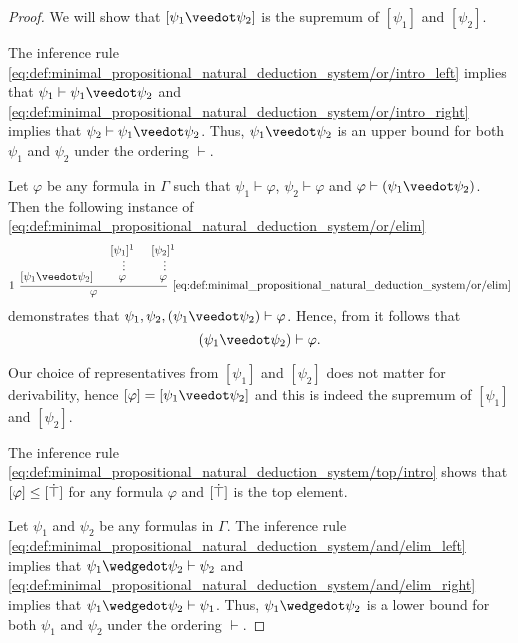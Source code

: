 \begin{proof}
   We will show that \( [\psi_1 \synvee \psi_2] \) is the supremum of \( [\psi_1] \) and \( [\psi_2] \).

  The inference rule \eqref{eq:def:minimal_propositional_natural_deduction_system/or/intro_left} implies that \( \psi_1 \vdash \psi_1 \synvee \psi_2 \) and \eqref{eq:def:minimal_propositional_natural_deduction_system/or/intro_right} implies that \( \psi_2 \vdash \psi_1 \synvee \psi_2 \). Thus, \( \psi_1 \synvee \psi_2 \) is an upper bound for both \( \psi_1 \) and \( \psi_2 \) under the ordering \( \vdash \).

  Let \( \varphi \) be any formula in \( \Gamma \) such that \( \psi_1 \vdash \varphi \), \( \psi_2 \vdash \varphi \) and \( \varphi \vdash (\psi_1 \synvee \psi_2) \). Then the following instance of \eqref{eq:def:minimal_propositional_natural_deduction_system/or/elim}
  \begin{equation*}
    \begin{prooftree}
      \hypo{ [\psi_1 \synvee \psi_2] }
      \hypo{ [\psi_1]^1 }
      \ellipsis {} { \varphi }
      \hypo{ [\psi_2]^1 }
      \ellipsis {} { \varphi }
      \infer[left label=\( 1 \)]3[\ref{eq:def:minimal_propositional_natural_deduction_system/or/elim}]{ \varphi }
    \end{prooftree}
  \end{equation*}
  demonstrates that \( \psi_1, \psi_2, (\psi_1 \synvee \psi_2) \vdash \varphi \). Hence, from  it follows that
  \begin{equation*}
    (\psi_1 \synvee \psi_2) \vdash \varphi.
  \end{equation*}

  Our choice of representatives from \( [\psi_1] \) and \( [\psi_2] \) does not matter for derivability, hence \( [\varphi] = [\psi_1 \synvee \psi_2] \) and this is indeed the supremum of \( [\psi_1] \) and \( [\psi_2] \).

   The inference rule \eqref{eq:def:minimal_propositional_natural_deduction_system/top/intro} shows that \( [\varphi] \leq [\dot\top] \) for any formula \( \varphi \) and \( [\dot\top] \) is the top element.

   Let \( \psi_1 \) and \( \psi_2 \) be any formulas in \( \Gamma \). The inference rule \eqref{eq:def:minimal_propositional_natural_deduction_system/and/elim_left} implies that \( \psi_1 \synwedge \psi_2 \vdash \psi_2 \) and \eqref{eq:def:minimal_propositional_natural_deduction_system/and/elim_right} implies that \( \psi_1 \synwedge \psi_2 \vdash \psi_1 \). Thus, \( \psi_1 \synwedge \psi_2 \) is a lower bound for both \( \psi_1 \) and \( \psi_2 \) under the ordering \( \vdash \).


\end{proof}
